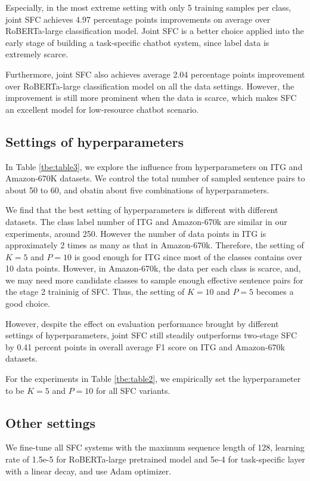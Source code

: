 Especially, in the most extreme setting with only 5 training samples per class, joint SFC achieves 4.97 percentage points improvements on average over RoBERTa-large classification model. 
Joint SFC is a better choice applied into the early stage of building a task-specific chatbot system, since label data is extremely scarce.

Furthermore, joint SFC also achieves average 2.04 percentage points improvement over RoBERTa-large classification model on all the data settings. 
However, the improvement is still more prominent when the data is scarce, which makes SFC an excellent model for low-resource chatbot scenario.

\subsection{Settings of hyperparameters} 
In Table \ref{tbe:table3}, we explore the influence from hyperparameters on ITG and Amazon-670K datasets. 
We control the total number of sampled sentence pairs to about 50 to 60, and obatin about five combinations of hyperparameters. 

We find that the best setting of hyperparameters is different with different datasets. 
The class label number of ITG and Amazon-670k are similar in our experiments, around 250. 
However the number of data points in ITG is approximately 2 times as many as that in Amazon-670k.
Therefore, the setting of $K=5$ and $P=10$ is good enough for ITG since most of the classes contains over 10 data points. 
However, in Amazon-670k, the data per each class is scarce, and, we may need more candidate classes to sample enough effective sentence pairs for the stage 2 traininig of SFC. 
Thus, the setting of $K=10$ and $P=5$ becomes a good choice. 

However, despite the effect on evaluation performance brought by different settings of hyperparameters, joint SFC still steadily outperforms two-stage SFC by 0.41 percent points in overall average F1 score on ITG and Amazon-670k datasets.

For the experiments in Table \ref{tbe:table2}, we empirically set the hyperparameter to be $K=5$ and $P=10$ for all SFC variants. 

\subsection{Other settings}
We fine-tune all SFC systems with the maximum sequence length of 128, learning rate of 1.5e-5 for RoBERTa-large pretrained model and 5e-4 for task-specific layer with a linear decay, and use Adam optimizer.

